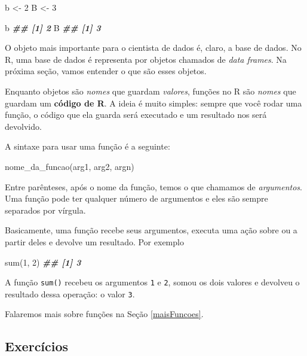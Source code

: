 \documentclass[
]{book}
\newenvironment{Shaded}{\begin{snugshade}}{\end{snugshade}}
\newcommand{\DecValTok}[1]{\textcolor[rgb]{0.00,0.00,0.81}{#1}}
\newcommand{\DocumentationTok}[1]{\textcolor[rgb]{0.56,0.35,0.01}{\textbf{\textit{#1}}}}
\newcommand{\FunctionTok}[1]{\textcolor[rgb]{0.00,0.00,0.00}{#1}}
\newcommand{\NormalTok}[1]{#1}
\newcommand{\OtherTok}[1]{\textcolor[rgb]{0.56,0.35,0.01}{#1}}
\begin{document}
\begin{Shaded}
\begin{Highlighting}[]
\NormalTok{b }\OtherTok{\textless{}{-}} \DecValTok{2}
\NormalTok{B }\OtherTok{\textless{}{-}} \DecValTok{3}

\NormalTok{b}
\DocumentationTok{\#\# [1] 2}
\NormalTok{B}
\DocumentationTok{\#\# [1] 3}
\end{Highlighting}
\end{Shaded}

O objeto mais importante para o cientista de dados é, claro, a base de dados. No R, uma base de dados é representa por objetos chamados de \emph{data frames}. Na próxima seção, vamos entender o que são esses objetos.

Enquanto objetos são \emph{nomes} que guardam \emph{valores}, funções no R são \emph{nomes} que guardam um \textbf{código de R}. A ideia é muito simples: sempre que você rodar uma função, o código que ela guarda será executado e um resultado nos será devolvido.

A sintaxe para usar uma função é a seguinte:

\begin{Shaded}
\begin{Highlighting}[]
\FunctionTok{nome\_da\_funcao}\NormalTok{(arg1, arg2, argn)}
\end{Highlighting}
\end{Shaded}

Entre parênteses, após o nome da função, temos o que chamamos de \emph{argumentos}. Uma função pode ter qualquer número de argumentos e eles são sempre separados por vírgula.

Basicamente, uma função recebe seus argumentos, executa uma ação sobre ou a partir deles e devolve um resultado. Por exemplo

\begin{Shaded}
\begin{Highlighting}[]
\FunctionTok{sum}\NormalTok{(}\DecValTok{1}\NormalTok{, }\DecValTok{2}\NormalTok{)}
\DocumentationTok{\#\# [1] 3}
\end{Highlighting}
\end{Shaded}

A função \texttt{sum()} recebeu os argumentos \texttt{1} e \texttt{2}, somou os dois valores e devolveu o resultado dessa operação: o valor \texttt{3}.

Falaremos mais sobre funções na Seção \ref{maisFuncoes}.

\hypertarget{exercuxedcios-1}{%
\subsection*{Exercícios}\label{exercuxedcios-1}}
\end{document}
